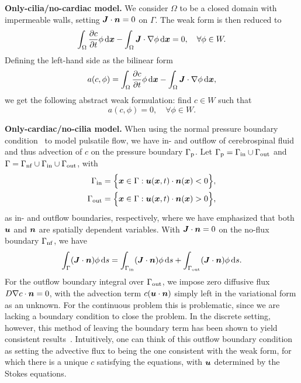 \documentclass{WileyMSP-template}
\begin{document}
\textbf{Only-cilia/no-cardiac model.} We consider $\Omega$ to be
a closed domain with impermeable walls, setting $\bm{J}\cdot\bm{n}=0$ on $\Gamma$.
The weak form is then reduced to
\begin{equation*}
    \int_{\Omega}\frac{\partial c}{\partial t}\phi \, \mathrm d\bm{x} - \int_{\Omega}\bm{J}\cdot\nabla\phi \, \mathrm d\bm{x} = 0, \quad\forall\phi\in W.
\end{equation*}
Defining the left-hand side as the bilinear form
\begin{equation*}
    a(c, \phi) = \int_{\Omega}\frac{\partial c}{\partial t}\phi \, \mathrm d\bm{x} - \int_{\Omega}\bm{J}\cdot\nabla\phi \, \mathrm d\bm{x}, 
\end{equation*}
we get the following abstract weak formulation: find $c\in W$ such that
\begin{equation*}
    a(c, \phi) = 0, \quad\forall\phi\in W.
\end{equation*}

\textbf{Only-cardiac/no-cilia model.} When using the normal pressure
boundary condition~ to model pulsatile flow,
we have in- and outflow of cerebrospinal fluid and thus advection of
$c$ on the pressure boundary $\Gamma_{\mathrm{p}}$.
Let $\Gamma_{\mathrm{p}}=\Gamma_{\mathrm{in}}\cup\Gamma_{\mathrm{out}}$ and $\Gamma = \Gamma_{\mathrm{nf}}\cup\Gamma_{\mathrm{in}}\cup\Gamma_{\mathrm{out}}$, with 
\begin{align*}
    \Gamma_{\mathrm{in}}  &= \Big\{\bm{x}\in\Gamma : \bm{u}(\bm{x}, t)\cdot\bm{n}(\bm{x}) < 0 \Big\}, \\
    \Gamma_{\mathrm{out}} &= \Big\{\bm{x}\in\Gamma : \bm{u}(\bm{x}, t)\cdot\bm{n}(\bm{x}) > 0 \Big\},
\end{align*}
as in- and outflow boundaries, respectively, where we have emphasized that
both $\bm{u}$ and $\bm{n}$ are spatially dependent variables.
With $\bm{J}\cdot\bm{n}=0$ on the no-flux boundary $\Gamma_{\mathrm{nf}}$, we have
\begin{equation*}
    \int_{\Gamma}(\bm{J}\cdot\bm{n})\phi \, \mathrm ds = \int_{\Gamma_{\mathrm{in}}}(\bm{J}\cdot\bm{n})\phi \, \mathrm ds + \int_{\Gamma_{\mathrm{out}}}(\bm{J}\cdot\bm{n})\phi \, \mathrm ds. 
\end{equation*}
For the outflow boundary integral over $\Gamma_{\mathrm{out}}$, we impose zero
diffusive flux $D\nabla c\cdot\bm{n}=0$,
with the advection term $c(\bm{u}\cdot\bm{n})$ simply left in the variational form as an unknown.
For the continuous problem this is problematic, since we are lacking a boundary
condition to close the problem. 
In the discrete setting, however, this method of leaving the boundary term has been shown
to yield consistent results~\cite{Papanastasiou1992ACondition, Lynch2020NumericalHemodynamics,
Griffiths1997TheCondition}. Intuitively, one can think of this outflow boundary condition as
setting the advective flux to being the one consistent with the weak form,
for which there is a unique $c$ satisfying the equations, with $\bm{u}$ determined by
the Stokes equations. 
\end{document}
